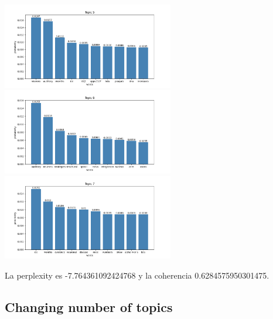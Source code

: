 \documentclass[10pt]{article} %
\begin{document}
\begin{center}
		\includegraphics[width=7.5cm]{images/plots/test_8_no_stopwords/topic_5.png}
		\includegraphics[width=7.5cm]{images/plots/test_8_no_stopwords/topic_6.png}
		\includegraphics[width=7.5cm]{images/plots/test_8_no_stopwords/topic_7.png}
		
		
	\end{center}

	La perplexity es -7.764361092424768 y la coherencia  0.6284575950301475.

	
	\subsection{Changing number of topics}
	
\end{document}
